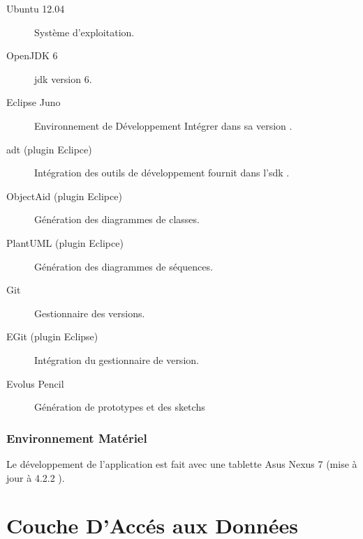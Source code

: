 \begin{description}

\item [Ubuntu 12.04] Système d'exploitation.\footnotemark[1]

\item [OpenJDK 6] \gls{jdk} version 6.\footnotemark[2]

\item [Eclipse Juno] Environnement de Développement Intégrer dans sa version .\footnotemark[3]

\item [\gls{adt} (plugin Eclipce)] Intégration des outils de développement fournit dans l'\gls{sdk} \android{}.\footnotemark[4]

\item [ObjectAid (plugin Eclipce)] Génération des diagrammes de classes.\footnotemark[5]

\item [PlantUML (plugin Eclipce)] Génération des diagrammes de séquences.\footnotemark[6]

\item [Git] Gestionnaire des versions\footnotemark[7].

\item [EGit (plugin Eclipse)] Intégration du gestionnaire de version.\footnotemark[8]

\item [Evolus Pencil] Génération de prototypes et des sketchs\footnotemark[9]
\end{description}


\subsubsection{Environnement Matériel}
Le développement de l'application est fait avec une tablette Asus Nexus 7 (mise à jour à \android{} 4.2.2 ).



\section[Couche D'Accés aux Données]{Couche D'Accés aux Données}

